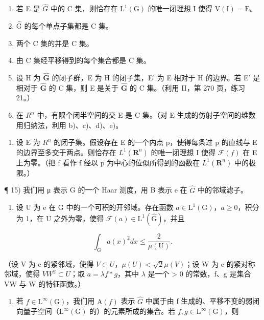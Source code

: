 \begin{enumerate}
\def\labelenumi{\alph{enumi})}
\item
  若 E 是 \(\widehat{G}\) 中的 C 集，则恰存在 \(\mathrm{L}^1 (\mathrm{G})\) 的唯一闭理想 I 使得 \(\mathrm{V(I)} = \mathrm{E}\)。
\item
  \(\widehat{\mathrm{G}}\) 的每个单点子集都是 C 集。
\item
  两个 C 集的并是 C 集。
\item
  由 C 集经平移得到的每个集合都是 C 集。
\item
  设 H 为 \(\widehat{\mathbf{G}}\) 的闭子群，E 为 H 的闭子集，E' 为 E 相对于 H 的边界。若 E' 是相对于 \(\widehat{\mathbf{G}}\) 的 C 集，则 E 是关于 \(\widehat{\mathbf{G}}\) 的 C 集。（利用 II，第 270 页，练习 21。）
\item
  在 \(R^{n}\) 中，有限个闭半空间的交 E 是 C 集。（对 E 生成的仿射子空间的维数用归纳法，利用 b)、c)、d)、e)。
\end{enumerate}

\begin{enumerate}
\def\labelenumi{\arabic{enumi})}
\setcounter{enumi}{13}
\tightlist
\item
  设 E 为 \(R^{n}\) 的闭子集。假设存在 E 的一个内点 p，使得每条过 p 的直线与 E 的边界至多交于两点。则恰存在 \(L^{1}(\mathbf{R}^{n})\) 的唯一闭理想 I 使得 \(\mathcal{F}(f)\) 在 E 上为零。（把 f 看作 f 经以 p 为中心的位似所得到的函数在 \(L^{1}(\mathbf{R}^{n})\) 中的极限。）
\end{enumerate}

¶ 15) 我们用 μ 表示 G 的一个 Haar 测度，用 B 表示 e 在 \(\widehat{G}\) 中的邻域滤子。

\begin{enumerate}
\def\labelenumi{\alph{enumi})}
\tightlist
\item
  设 U 为 e 在 G 中的一个可积的开邻域。存在函数 \(a \in \mathrm{L}^{1}(\mathrm{G})\)，\(a \geqslant 0\)，积分为 1，在 U 之外为零，使得 \(\mathcal{F}(a) \in \mathrm{L}^{1}(\widehat{\mathrm{G}})\)，并且
\end{enumerate}

\[
\int_ {\mathrm{G}} a (x) ^ {2} d x \leqslant \frac {2}{\mu (\mathrm{U})}.
\]

（设 V 为 e 的紧邻域，使得 \(V \subset U\)，\(\mu(U) < \sqrt{2}\mu(V)\)；设 W 为 e 的紧对称邻域，使得 \(VW^{2} \subset U\)；取 \(a = \lambda f * g\)，其中 \(\lambda\) 是一个 \textgreater{} 0 的常数，f、g 是集合 VW 与 W 的特征函数。）

\begin{enumerate}
\def\labelenumi{\alph{enumi})}
\setcounter{enumi}{1}
\tightlist
\item
  若 \(f \in \mathrm{L}^{\infty}(\mathrm{G})\)，我们用 \(\mathrm{A}(f)\) 表示 \(\widehat{G}\) 中属于由 f 生成的、平移不变的弱闭向量子空间（\(\mathrm{L}^{\infty}(\mathrm{G})\) 的）的元素所成的集合。若 \(f, g \in \mathrm{L}^{\infty}(\mathrm{G})\)，则
\end{enumerate}

